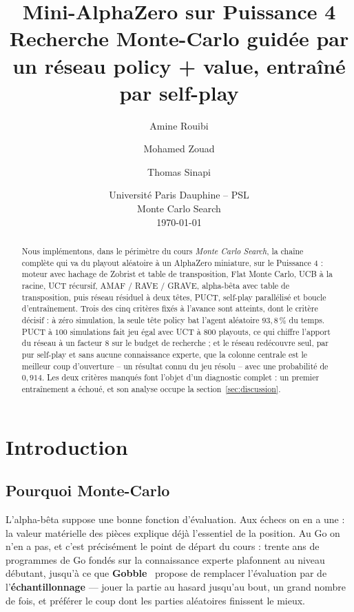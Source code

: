 \documentclass[11pt,a4paper]{article}
\title{\vspace{-1.5cm}\textbf{Mini-AlphaZero sur Puissance 4}\\[0.25em]
\large Recherche Monte-Carlo guidée par un réseau policy + value, entraîné par self-play}
\author{Amine Rouibi \and Mohamed Zouad \and Thomas Sinapi}
\date{Université Paris Dauphine -- PSL\\
Monte Carlo Search\\[0.3em]
\today}
\begin{document}
\maketitle
\thispagestyle{fancy}

\begin{abstract}
\noindent Nous implémentons, dans le périmètre du cours \emph{Monte Carlo Search},
la chaîne complète qui va du playout aléatoire à un AlphaZero miniature, sur le
Puissance 4 : moteur avec hachage de Zobrist et table de transposition, Flat Monte
Carlo, UCB à la racine, UCT récursif, AMAF / RAVE / GRAVE, alpha-bêta avec table de
transposition, puis réseau résiduel à deux têtes, PUCT, self-play parallélisé et
boucle d'entraînement. Trois des cinq critères fixés à l'avance sont atteints, dont
le critère décisif : à zéro simulation, la seule tête policy bat l'agent aléatoire
$93{,}8\,\%$ du temps. PUCT à $100$ simulations fait jeu égal avec UCT à $800$
playouts, ce qui chiffre l'apport du réseau à un facteur $8$ sur le budget de
recherche ; et le réseau redécouvre seul, par pur self-play et sans aucune
connaissance experte, que la colonne centrale est le meilleur coup d'ouverture --
un résultat connu du jeu résolu -- avec une probabilité de $0{,}914$. Les deux
critères manqués font l'objet d'un diagnostic complet : un premier entraînement a
échoué, et son analyse occupe la section~\ref{sec:discussion}.
\end{abstract}

\tableofcontents

\section{Introduction}\label{introduction}

\subsection{Pourquoi Monte-Carlo}\label{pourquoi-monte-carlo}

L'alpha-bêta suppose une bonne fonction d'évaluation. Aux échecs on en a une :
la valeur matérielle des pièces explique déjà l'essentiel de la position. Au Go
on n'en a pas, et c'est précisément le point de départ du cours : trente ans de
programmes de Go fondés sur la connaissance experte plafonnent au niveau
débutant, jusqu'à ce que \textbf{Gobble}~\cite{brugmann1993} propose de remplacer
l'évaluation par de l'\textbf{échantillonnage} --- jouer la partie au hasard jusqu'au
bout, un grand nombre de fois, et préférer le coup dont les parties aléatoires
finissent le mieux.
\end{document}
